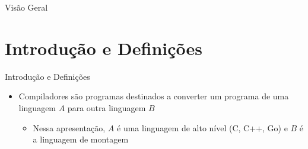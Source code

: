 \customtitlepage


\begin{frame}{Visão Geral}
  \overview
\end{frame}

\section{Introdução e Definições}

\begin{frame}{Introdução e Definições}
  \begin{itemize}
    \item Compiladores são programas destinados a converter um programa de uma linguagem $A$ para outra linguagem $B$
        \begin{itemize}
            \item Nessa apresentação, $A$ é uma linguagem de alto nível (C, C++, Go) e $B$ é a linguagem de montagem
        \end{itemize}
  \end{itemize}
\end{frame}

